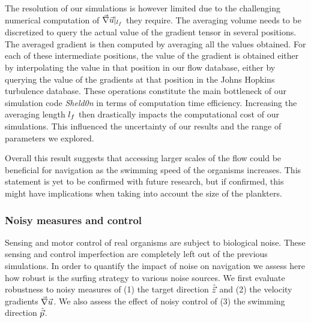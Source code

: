 The resolution of our simulations is however limited due to the challenging numerical computation of $\vec{\nabla} \vec{u} |_{l_{f}}$ they require.
The averaging volume needs to be discretized to query the actual value of the gradient tensor in several positions.
The averaged gradient is then computed by averaging all the values obtained.
For each of these intermediate positions, the value of the gradient is obtained either by interpolating the value in that position in our flow database, either by querying the value of the gradients at that position in the Johns Hopkins turbulence database.
These operations constitute the main bottleneck of our simulation code \textit{Sheld0n} in terms of computation time efficiency.
Increasing the averaging length $l_{f}$ then drastically impacts the computational cost of our simulations.
This influenced the uncertainty of our results and the range of parameters we explored.

Overall this result suggests that accessing larger scales of the flow could be beneficial for navigation as the swimming speed of the organisms increases.
This statement is yet to be confirmed with future research, but if confirmed, this might have implications when taking into account the size of the plankters.


\subsubsection{Noisy measures and control}\label{sec:noisy_measure_and_control}

Sensing and motor control of real organisms are subject to biological noise.
These sensing and control imperfection are completely left out of the previous simulations.
In order to quantify the impact of noise on navigation we assess here how robust is the surfing strategy to various noise sources. 
We first evaluate robustness to noisy measures of (1) the target direction $\hat{\vec{z}}$ and (2) the velocity gradients $\vec{\nabla} \vec{u}$.
We also assess the effect of noisy control of (3) the swimming direction $\hat{\vec{p}}$.

